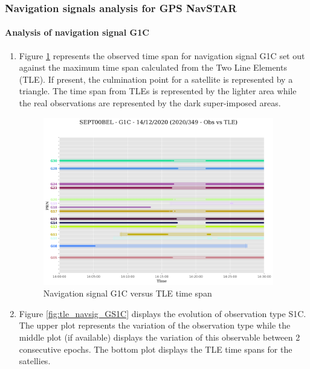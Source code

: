 %
\subsubsection{Navigation signals analysis for GPS NavSTAR}%
\label{ssubsec:NavigationsignalsanalysisforGPSNavSTAR}%
\newpage%
\paragraph{Analysis of navigation signal G1C}%
\label{para:AnalysisofnavigationsignalG1C}%
\newpage%
\begin{enumerate}%
\item%
Figure \ref{fig:tle_navsig_1CG} represents the observed time span for navigation signal G1C set out against the maximum time span calculated from the  Two Line Elements (TLE). If present, the culmination point for a satellite is represented by a triangle. The time span from TLEs is represented by the lighter area while the real observations are represented by the dark super-imposed areas.%


\begin{figure}[H]%
\centering%
\includegraphics[width=0.95\textwidth]{png/SEPT00BEL_R_20203491400_30M_01S_MO_G-G1C-TLE-arcs.png}%
\caption{\label{fig:tle_navsig_1CG} Navigation signal G1C versus TLE time span}%
\end{figure}

%
\item%
Figure \ref{fig:tle_navsig_GS1C} displays the evolution of observation type S1C. \newline The upper plot represents the variation of the observation type while the middle plot (if available) displays the variation of this observable between 2 consecutive epochs. The bottom plot displays the TLE time spans for the satellies.%



\end{enumerate}
